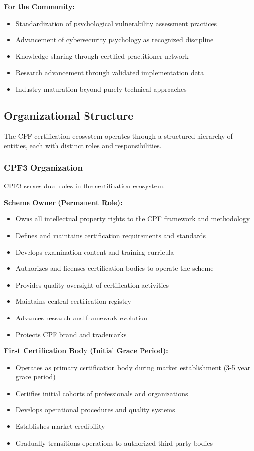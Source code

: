 \documentclass[11pt,a4paper]{article}
\begin{document}
\textbf{For the Community:}
\begin{itemize}
\item Standardization of psychological vulnerability assessment practices
\item Advancement of cybersecurity psychology as recognized discipline
\item Knowledge sharing through certified practitioner network
\item Research advancement through validated implementation data
\item Industry maturation beyond purely technical approaches
\end{itemize}

\subsection{Organizational Structure}

The CPF certification ecosystem operates through a structured hierarchy of entities, each with distinct roles and responsibilities.

\subsubsection{CPF3 Organization}

CPF3 serves dual roles in the certification ecosystem:

\textbf{Scheme Owner (Permanent Role):}

\begin{itemize}
\item Owns all intellectual property rights to the CPF framework and methodology
\item Defines and maintains certification requirements and standards
\item Develops examination content and training curricula
\item Authorizes and licenses certification bodies to operate the scheme
\item Provides quality oversight of certification activities
\item Maintains central certification registry
\item Advances research and framework evolution
\item Protects CPF brand and trademarks
\end{itemize}

\textbf{First Certification Body (Initial Grace Period):}

\begin{itemize}
\item Operates as primary certification body during market establishment (3-5 year grace period)
\item Certifies initial cohorts of professionals and organizations
\item Develops operational procedures and quality systems
\item Establishes market credibility
\item Gradually transitions operations to authorized third-party bodies
\end{itemize}
\end{document}
